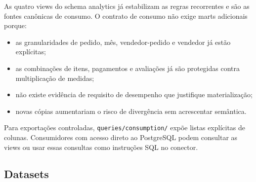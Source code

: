 \documentclass[12pt,a4paper]{article}
\providecommand{\tightlist}{
  \setlength{\itemsep}{0pt}\setlength{\parskip}{0pt}
}
\begin{document}
As quatro views do schema analytics já estabilizam as regras recorrentes e
são as fontes canônicas de consumo. O contrato de consumo não exige marts adicionais
porque:

\begin{itemize}
\tightlist
\item
  as granularidades de pedido, mês, vendedor-pedido e vendedor já estão
  explícitas;
\item
  as combinações de itens, pagamentos e avaliações já são protegidas
  contra multiplicação de medidas;
\item
  não existe evidência de requisito de desempenho que justifique
  materialização;
\item
  novas cópias aumentariam o risco de divergência sem acrescentar
  semântica.
\end{itemize}

Para exportações controladas, \nolinkurl{queries/consumption/} expõe
listas explícitas de colunas. Consumidores com acesso direto ao
PostgreSQL podem consultar as views ou usar essas consultas como
instruções SQL no conector.

\subsection{Datasets}\label{docs__analytics__consumo_power_bi_sql.md__datasets}
\end{document}
